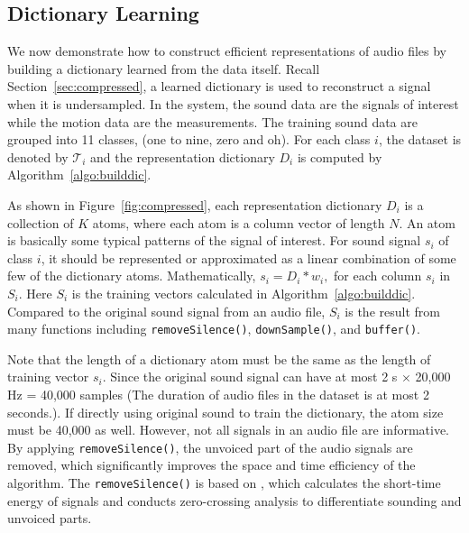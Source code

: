 \subsection{Dictionary Learning}\label{sec:design:dict}
We now demonstrate how to construct efficient representations of audio files by building a dictionary learned from the data itself. 
Recall Section~\ref{sec:compressed}, a learned dictionary is used to reconstruct a signal when it is undersampled. 
%
In the {\systemName} system, the sound data are the signals of interest while the motion data are the measurements. The training sound data are grouped into 11 classes, (one to nine, zero and oh). For each class $i$, the dataset is denoted by $\mathcal{T}_i$ and the representation dictionary $D_i$ is computed by Algorithm~\ref{algo:builddic}.

As shown in Figure~\ref{fig:compressed}, each representation dictionary $D_i$ is a collection of $K$ atoms, where each atom is a column vector of length $N$. An atom is basically some typical patterns of the signal of interest. For sound signal $s_i$ of class $i$,
it should be represented or approximated as a linear combination of some few of the dictionary atoms. Mathematically,
	$s_i = D_i * w_i,$
 for each column $s_i$ in $S_i$. Here $S_i$ is the training vectors calculated in Algorithm~\ref{algo:builddic}. Compared to the original sound signal from an audio file, $S_i$ is the result from many functions including \verb|removeSilence()|, \verb|downSample()|, and \verb|buffer()|. 
 


 
 
 Note that the length of a dictionary atom must be the same as the length of training vector $s_i$. Since the original sound signal can have at most 2 s $\times$ 20,000 Hz = 40,000 samples (The duration of audio files in the dataset is at most 2 seconds.). If directly using original sound to train the dictionary, the atom size must be 40,000 as well. However, not all signals in an audio file are informative. By applying \verb|removeSilence()|, the unvoiced part of the audio signals are removed, which significantly improves the space and time efficiency of the algorithm. The \verb|removeSilence()| is  based on \cite{rabiner2011theory}, which calculates the short-time energy of signals and conducts zero-crossing analysis to differentiate  sounding and unvoiced parts.
 
